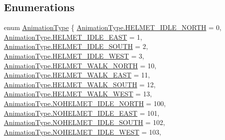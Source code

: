 \subsection*{Enumerations}
\begin{DoxyCompactItemize}
\item 
enum \hyperlink{namespace_animation_a2088578945c96e9b64b66bd44b2c57c8}{Animation\+Type} \{ \newline
\hyperlink{namespace_animation_a2088578945c96e9b64b66bd44b2c57c8a5a4d804b0bce2ce1de5202116c40528f}{Animation\+Type.\+H\+E\+L\+M\+E\+T\+\_\+\+I\+D\+L\+E\+\_\+\+N\+O\+R\+TH} = 0, 
\hyperlink{namespace_animation_a2088578945c96e9b64b66bd44b2c57c8a7ec95007a57fbd8d6f86f9eba6a33099}{Animation\+Type.\+H\+E\+L\+M\+E\+T\+\_\+\+I\+D\+L\+E\+\_\+\+E\+A\+ST} = 1, 
\hyperlink{namespace_animation_a2088578945c96e9b64b66bd44b2c57c8a1d3f039db369a017815d763d47457c5c}{Animation\+Type.\+H\+E\+L\+M\+E\+T\+\_\+\+I\+D\+L\+E\+\_\+\+S\+O\+U\+TH} = 2, 
\hyperlink{namespace_animation_a2088578945c96e9b64b66bd44b2c57c8aaf92740000ea30730f97266307900001}{Animation\+Type.\+H\+E\+L\+M\+E\+T\+\_\+\+I\+D\+L\+E\+\_\+\+W\+E\+ST} = 3, 
\newline
\hyperlink{namespace_animation_a2088578945c96e9b64b66bd44b2c57c8ac816b064af0a54a2870157f6d2854162}{Animation\+Type.\+H\+E\+L\+M\+E\+T\+\_\+\+W\+A\+L\+K\+\_\+\+N\+O\+R\+TH} = 10, 
\hyperlink{namespace_animation_a2088578945c96e9b64b66bd44b2c57c8a105b5490dfcabd26c5e687256799a25e}{Animation\+Type.\+H\+E\+L\+M\+E\+T\+\_\+\+W\+A\+L\+K\+\_\+\+E\+A\+ST} = 11, 
\hyperlink{namespace_animation_a2088578945c96e9b64b66bd44b2c57c8aaa9ef32f599657198a34b0dae322164d}{Animation\+Type.\+H\+E\+L\+M\+E\+T\+\_\+\+W\+A\+L\+K\+\_\+\+S\+O\+U\+TH} = 12, 
\hyperlink{namespace_animation_a2088578945c96e9b64b66bd44b2c57c8a15e06bce789d8b3f93f034c3957f16f0}{Animation\+Type.\+H\+E\+L\+M\+E\+T\+\_\+\+W\+A\+L\+K\+\_\+\+W\+E\+ST} = 13, 
\newline
\hyperlink{namespace_animation_a2088578945c96e9b64b66bd44b2c57c8a9a27fdde63aa46519177ab9fe96b6904}{Animation\+Type.\+N\+O\+H\+E\+L\+M\+E\+T\+\_\+\+I\+D\+L\+E\+\_\+\+N\+O\+R\+TH} = 100, 
\hyperlink{namespace_animation_a2088578945c96e9b64b66bd44b2c57c8a6f8c57d3ad86355939e864a404ec4704}{Animation\+Type.\+N\+O\+H\+E\+L\+M\+E\+T\+\_\+\+I\+D\+L\+E\+\_\+\+E\+A\+ST} = 101, 
\hyperlink{namespace_animation_a2088578945c96e9b64b66bd44b2c57c8a9551bb6960d4228b2c44a5b443119cd8}{Animation\+Type.\+N\+O\+H\+E\+L\+M\+E\+T\+\_\+\+I\+D\+L\+E\+\_\+\+S\+O\+U\+TH} = 102, 
\hyperlink{namespace_animation_a2088578945c96e9b64b66bd44b2c57c8a78ab90b231a0b3e34bfd918ca3808788}{Animation\+Type.\+N\+O\+H\+E\+L\+M\+E\+T\+\_\+\+I\+D\+L\+E\+\_\+\+W\+E\+ST} = 103, 

\end{DoxyCompactItemize}
